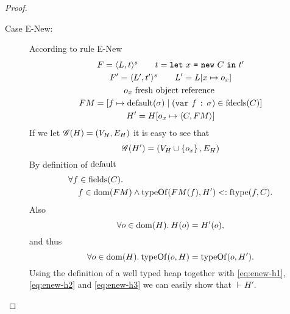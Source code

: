 \begin{proof}
\begin{description}
\begin{description}
\begin{description}
            \item[Case {\sc E-New}:] According to rule {\sc E-New}
              \begin{equation} \label{eq:enew1}
                \begin{gathered} 
                  F = \mbox{$\langle L, t \rangle^s$} \quad\quad t = \mbox{\mdseries\texttt{let}~$x$~\texttt{=}~$\mbox{\mdseries\texttt{new}~$C$}$~\texttt{in}~$t'$} \\
                  F' = \mbox{$\langle L', t' \rangle^s$} \quad\quad L' = L[x \mapsto o_x] \\
                  o_x \text{ fresh object reference } \\
                  FM = [f \mapsto \mbox{$\mathrm{default}$}(\sigma) \mid (\mbox{\mdseries\texttt{var}~$f$~\texttt{:}~$\sigma$}) \in
                  \mbox{$\mathrm{fdecls}$}(C)] \\
                  H' = H[o_x \mapsto \mbox{$\langle C, FM \rangle$}]
                \end{gathered}
              \end{equation}
              If we let $\mathscr{G}(H) = (V_H, E_H)$ it is easy to see that
              \begin{equation}
                \mathscr{G}(H') = ( V_H \cup \left\{ o_x \right\}, E_H )
              \end{equation}
              By definition of $\mbox{$\mathrm{default}$}$
              \begin{equation} \label{eq:enew-h1}
                \begin{aligned}
                  \forall f &\in \mbox{$\mathrm{fields}$}(C).\\
                  &f \in \mbox{$\mathrm{dom}$}(FM) \land \mbox{$\mathrm{typeOf}$}(FM(f), H') <: \mbox{$\mathrm{ftype}$}(f, C).
                \end{aligned}
              \end{equation}
              Also
              \begin{equation}
                \forall o \in \mbox{$\mathrm{dom}$}(H). \: H(o) = H'(o) \label{eq:enew-h2},
              \end{equation}
              and thus
              \begin{equation}
                \forall o \in \mbox{$\mathrm{dom}$}(H). \: \mbox{$\mathrm{typeOf}$}(o, H) = \mbox{$\mathrm{typeOf}$}(o, H').
                \label{eq:enew-h3}
              \end{equation}
              Using the definition of a well typed heap together with
              \eqref{eq:enew-h1}, \eqref{eq:enew-h2} and \eqref{eq:enew-h3} we
              can easily show that $\vdash H'$.


\end{description}
\end{description}
\end{description}
\end{proof}
